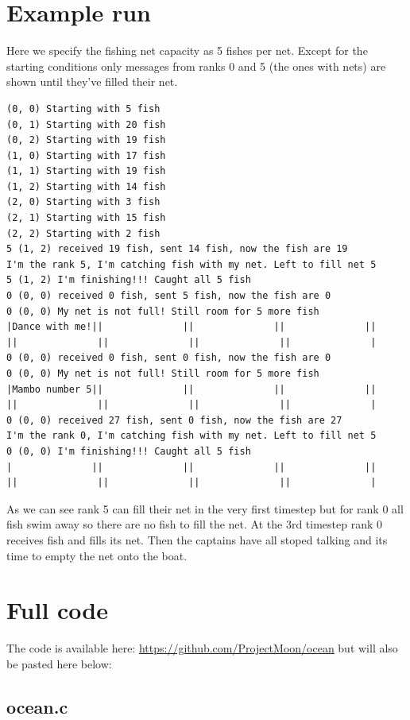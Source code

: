 \documentclass{article}
\begin{document}
\section{Example run}
Here we specify the fishing net capacity as 5 fishes per net. Except for the starting conditions only messages from ranks 0 and 5 (the ones with nets) are shown until they've filled their net.
\begin{verbatim}
(0, 0) Starting with 5 fish
(0, 1) Starting with 20 fish
(0, 2) Starting with 19 fish
(1, 0) Starting with 17 fish
(1, 1) Starting with 19 fish
(1, 2) Starting with 14 fish
(2, 0) Starting with 3 fish
(2, 1) Starting with 15 fish
(2, 2) Starting with 2 fish
5 (1, 2) received 19 fish, sent 14 fish, now the fish are 19
I'm the rank 5, I'm catching fish with my net. Left to fill net 5
5 (1, 2) I'm finishing!!! Caught all 5 fish
0 (0, 0) received 0 fish, sent 5 fish, now the fish are 0
0 (0, 0) My net is not full! Still room for 5 more fish
|Dance with me!||              ||              ||              ||              ||              ||              ||              ||              |
0 (0, 0) received 0 fish, sent 0 fish, now the fish are 0
0 (0, 0) My net is not full! Still room for 5 more fish
|Mambo number 5||              ||              ||              ||              ||              ||              ||              ||              |
0 (0, 0) received 27 fish, sent 0 fish, now the fish are 27
I'm the rank 0, I'm catching fish with my net. Left to fill net 5
0 (0, 0) I'm finishing!!! Caught all 5 fish
|              ||              ||              ||              ||              ||              ||              ||              ||              |
\end{verbatim}
As we can see rank 5 can fill their net in the very first timestep but for rank 0 all fish swim away so there are no fish to fill the net. At the 3rd timestep rank 0 receives fish and fills its net. Then the captains have all stoped talking and its time to empty the net onto the boat.

\section{Full code}
The code is available here: \url{https://github.com/ProjectMoon/ocean} but will also be pasted here below:

\subsection*{ocean.c}
\end{document}

